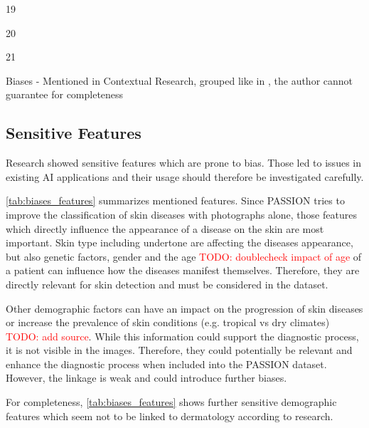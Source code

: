 \documentclass[12pt, a4paper, oneside]{book}   	%
\renewcommand{\todo}[1]{\textcolor{red}{TODO: #1}}
\begin{document}
\begin{table}[H]
\begin{threeparttable}
\begin{tablenotes}
\begin{minipage}{0.33\textwidth}
							\item[19] \autocite{Chakraborty_2024}
							\item[20] \autocite{Young_2020}
							\item[21] \autocite{Montoya_2025}
						\end{minipage}%
					\end{tablenotes}
				\end{threeparttable}
				\caption{Biases - Mentioned in Contextual Research, grouped like in \cite{Mehrabi_2021}, the author cannot guarantee for completeness}
				\label{tab:biases_types}
			\end{table}
			
			
			\subsection{Sensitive Features}
			Research showed sensitive features which are prone to bias. Those led to issues in existing AI applications and their usage should therefore be investigated carefully.
			
			\ref{tab:biases_features} summarizes mentioned features. Since PASSION tries to improve the classification of skin diseases with photographs alone, those features which directly influence the appearance of a disease on the skin are most important. Skin type including undertone are affecting the diseases appearance, but also genetic factors, gender and the age \todo{doublecheck impact of age} of a patient can influence how the diseases manifest themselves. Therefore, they are directly relevant for skin detection and must be considered in the dataset.
			
			Other demographic factors can have an impact on the progression of skin diseases or increase the prevalence of skin conditions (e.g. tropical vs dry climates) \todo{add source}. While this information could support the diagnostic process, it is not visible in the images. Therefore, they could potentially be relevant and enhance the diagnostic process when included into the PASSION dataset. However, the linkage is weak and could introduce further biases.
			
			For completeness, \ref{tab:biases_features} shows further sensitive demographic features which seem not to be linked to dermatology according to research.
			
\end{document}
